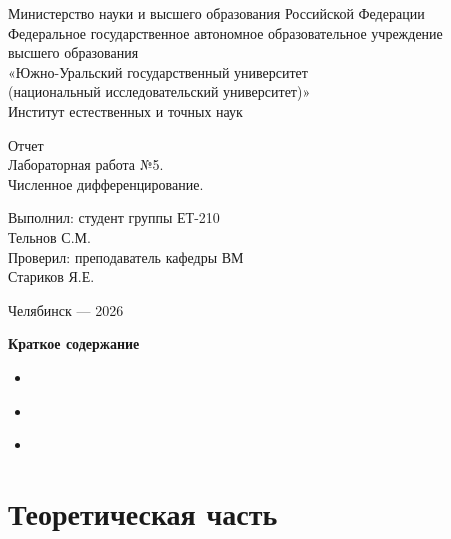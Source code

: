 \documentclass[a4paper]{article}
\begin{document}
\centering
Министерство науки и высшего образования Российской Федерации\\
Федеральное государственное автономное образовательное учреждение\\
высшего образования\\
«Южно-Уральский государственный университет\\
(национальный исследовательский университет)»\\
Институт естественных и точных наук

\setlength{\parskip}{7.5cm}

Отчет\\
Лабораторная работа №5.\\
Численное дифференцирование.

\setlength{\parskip}{6.5cm}

\raggedleft
\begin{minipage}{0.345\textwidth}
\raggedright
Выполнил: студент группы ЕТ-210\\
Тельнов С.М.\\
Проверил: преподаватель кафедры ВМ\\
Стариков Я.Е.
\end{minipage}

\setlength{\parskip}{6cm}

\centering
Челябинск — 2026

\setlength{\parskip}{0pt plus 1pt}
\newpage

\centering
\textbf{Краткое содержание}
\begin{itemize}
    \setlength{\parskip}{0.4cm}
    \item \hyperref[sec:theory]{ \dotfill \pageref{sec:theory}}
    \item \hyperref[sec:practice]{ \dotfill \pageref{sec:practice}}
    \item \hyperref[sec:conclusion]{ \dotfill \pageref{sec:conclusion}}
\end{itemize}

\setlength{\parindent}{1.5em}

\raggedright

\section*{\centering\fontsize{14pt}{0pt}\selectfont\textbf{Теоретическая часть}\label{sec:theory}}
\end{document}
